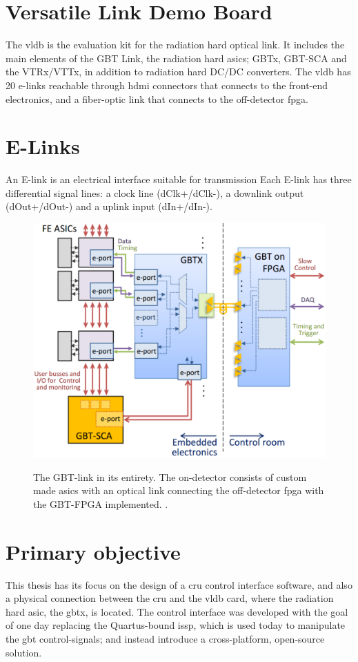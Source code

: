 \documentclass[main.tex]{subfiles}
\begin{document}
\section{Versatile Link Demo Board}

The \gls{vldb} is the evaluation kit for the radiation hard optical link. It includes the main elements of the GBT Link, the radiation hard \glspl{asic}; GBTx, GBT-SCA and the VTRx/VTTx, in addition to radiation hard DC/DC converters. The \gls{vldb} has 20 e-links reachable through \gls{hdmi} connectors that connects to the front-end electronics, and a fiber-optic link that connects to the off-detector \gls{fpga}.\\

\section{E-Links}
An E-link is an electrical interface suitable for transmission
Each E-link has three differential signal lines: a clock line (dClk+/dClk-), a downlink output (dOut+/dOut-) and a uplink input (dIn+/dIn-).


\begin{figure} %
\includegraphics[width=0.7\linewidth]{../img/gbtsys}  \\[0.1 cm]
\caption{The GBT-link in its entirety. The on-detector consists of custom made \glspl{asic} with an optical link connecting the off-detector \gls{fpga} with the GBT-FPGA implemented. \cite[Figure 1]{gbtscapres14}.}
\label{fig:gbtsys}
\end{figure}

\section{Primary objective}
This thesis has its focus on the design of a \gls{cru} control interface software, and also a physical connection between the \gls{cru} and the \gls{vldb} card, where the radiation hard \gls{asic}, the \gls{gbt}x, is located. The control interface was developed with the goal of one day replacing the Quartus-bound \gls{issp}, which is used today to manipulate the \gls{gbt} control-signals; and instead introduce a cross-platform, open-source solution. 
\end{document}
